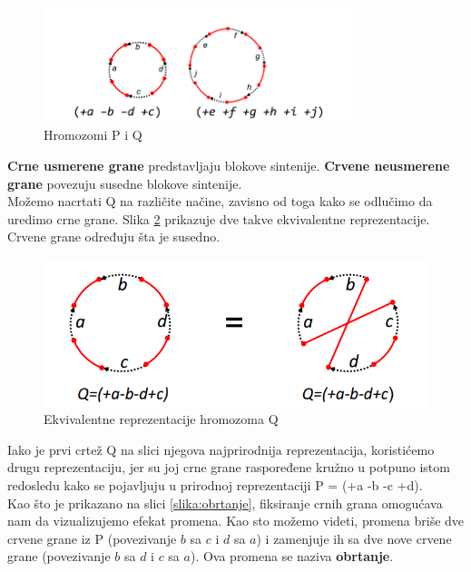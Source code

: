 \begin{figure}[h!]
\centering
\includegraphics[width = 0.8\textwidth]{poglavlja/6/slike/crne_crvene.PNG}
\caption{Hromozomi P i Q}
\label{slika:cirkularni}
\end{figure}

\textbf{Crne usmerene grane} predstavljaju blokove sintenije. \textbf{Crvene neusmerene grane} povezuju susedne blokove sintenije.\\

Možemo nacrtati Q na različite načine, zavisno od toga kako se odlučimo da uredimo crne grane. Slika \ref{slika:ekvivalentno} prikazuje dve takve ekvivalentne reprezentacije. Crvene grane određuju šta je susedno.

\begin{figure}[h!]
\centering
\includegraphics[scale=0.5]{poglavlja/6/slike/ekvivalentne.PNG}
\caption{Ekvivalentne reprezentacije hromozoma Q}
\label{slika:ekvivalentno}
\end{figure}


Iako je prvi crtež Q na slici njegova najprirodnija reprezentacija, koristićemo drugu reprezentaciju, jer su joj crne grane raspoređene kružno u potpuno istom redosledu kako se pojavljuju u prirodnoj reprezentaciji P = (+a -b -c +d).\\

Kao što je prikazano na slici \ref{slika:obrtanje}, fiksiranje crnih grana omogućava nam da vizualizujemo efekat promena. Kao sto možemo videti, promena briše dve crvene grane iz P (povezivanje $b$ sa $c$ i $d$ sa $a$) i zamenjuje ih sa dve nove crvene grane (povezivanje $b$ sa $d$ i $c$ sa $a$). Ova promena se naziva \textbf{obrtanje}.

